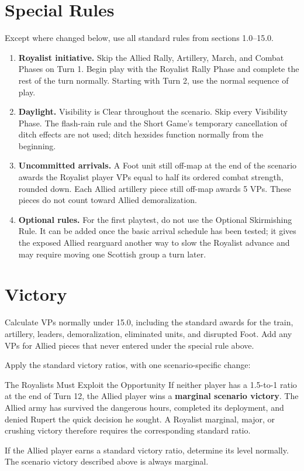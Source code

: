 \section{Special Rules}

Except where changed below, use all standard rules from sections 1.0--15.0.

\begin{enumerate}
  \item \textbf{Royalist initiative.} Skip the Allied Rally, Artillery, March,
    and Combat Phases on Turn 1. Begin play with the Royalist Rally Phase and
    complete the rest of the turn normally. Starting with Turn 2, use the normal
    sequence of play.

  \item \textbf{Daylight.} Visibility is Clear throughout the scenario. Skip
    every Visibility Phase. The flash-rain rule and the Short Game's temporary
    cancellation of ditch effects are not used; ditch hexsides function
    normally from the beginning.

  \item \textbf{Uncommitted arrivals.} A Foot unit still off-map at the end of the
    scenario awards the Royalist player VPs equal to half its ordered combat
    strength, rounded down. Each Allied artillery piece still off-map awards 5
    VPs. These pieces do not count toward Allied demoralization.

  \item \textbf{Optional rules.} For the first playtest, do not use the Optional
    Skirmishing Rule. It can be added once the basic arrival schedule has been
    tested; it gives the exposed Allied rearguard another way to slow the
    Royalist advance and may require moving one Scottish group a turn later.
\end{enumerate}

\section{Victory}

Calculate VPs normally under 15.0, including the standard awards for the train,
artillery, leaders, demoralization, eliminated units, and disrupted Foot. Add
any VPs for Allied pieces that never entered under the special rule above.

Apply the standard victory ratios, with one scenario-specific change:

\begin{redBox}{The Royalists Must Exploit the Opportunity}
If neither player has a 1.5-to-1 ratio at the end of Turn 12, the Allied player
wins a \textbf{marginal scenario victory}. The Allied army has survived the
dangerous hours, completed its deployment, and denied Rupert the quick decision
he sought. A Royalist marginal, major, or crushing victory therefore requires
the corresponding standard ratio.
\end{redBox}

If the Allied player earns a standard victory ratio, determine its level
normally. The scenario victory described above is always marginal.
